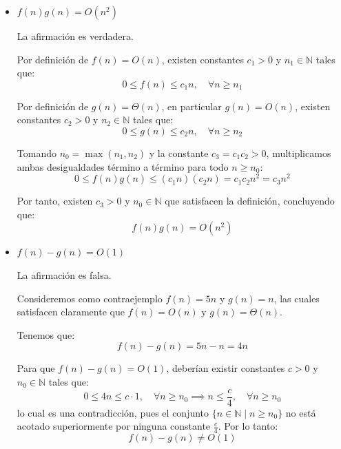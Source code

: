 \begin{enumerate}[label=\arabic*.]
\begin{itemize}
        Tomando $n_0 = \max(n_1, n_2)$ y la constante $c_3 = c_1 + c_2 > 0$, sumamos ambas desigualdades para todo $n \ge n_0$:
        \[
        0 \le f(n) + g(n) \le c_1 n + c_2 n = (c_1 + c_2)n = c_3 n
        \]
        
        Por tanto, existen $c_3 > 0$ y $n_0 \in \mathbb{N}$ que satisfacen la definición, concluyendo que:
        \[
        f(n) + g(n) = O(n)
        \]
        
        \item $f(n)g(n) = O(n^2)$

        La afirmación es verdadera.
        
        Por definición de $f(n) = O(n)$, existen constantes $c_1 > 0$ y $n_1 \in \mathbb{N}$ tales que:
        \[
        0 \le f(n) \le c_1 n, \quad \forall n \ge n_1
        \]
        
        Por definición de $g(n) = \Theta(n)$, en particular $g(n) = O(n)$, existen constantes $c_2 > 0$ y $n_2 \in \mathbb{N}$ tales que:
        \[
        0 \le g(n) \le c_2 n, \quad \forall n \ge n_2
        \]
        
        Tomando $n_0 = \max(n_1, n_2)$ y la constante $c_3 = c_1 c_2 > 0$, multiplicamos ambas desigualdades término a término para todo $n \ge n_0$:
        \[
        0 \le f(n)g(n) \le (c_1 n)(c_2 n) = c_1 c_2 n^2 = c_3 n^2
        \]
        
        Por tanto, existen $c_3 > 0$ y $n_0 \in \mathbb{N}$ que satisfacen la definición, concluyendo que:
        \[
        f(n)g(n) = O(n^2)
        \]

        \item $f(n)-g(n)=O(1)$
        
        La afirmación es falsa.
                
        Consideremos como contraejemplo $f(n) = 5n$ y $g(n) = n$, las cuales satisfacen claramente que $f(n) = O(n)$ y $g(n) = \Theta(n)$.
        
        Tenemos que:
        \[
        f(n) - g(n) = 5n - n = 4n
        \]
        
        Para que $f(n) - g(n) = O(1)$, deberían existir constantes $c > 0$ y $n_0 \in \mathbb{N}$ tales que:
        \[
        0 \le 4n \le c \cdot 1, \quad \forall n \ge n_0 \implies n \le \frac{c}{4}, \quad \forall n \ge n_0
        \]
        lo cual es una contradicción, pues el conjunto $\{n \in \mathbb{N} \mid n \ge n_0\}$ no está acotado superiormente por ninguna constante $\frac{c}{4}$. Por lo tanto:
        \[
        f(n) - g(n) \neq O(1)
        \]
    \end{itemize}


\end{enumerate}
